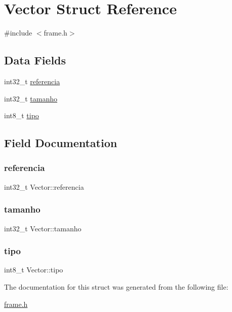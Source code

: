 \hypertarget{structVector}{}\section{Vector Struct Reference}
\label{structVector}


{\ttfamily \#include $<$frame.\+h$>$}

\subsection*{Data Fields}
\begin{DoxyCompactItemize}
\item 
int32\+\_\+t \hyperlink{structVector_a0f2af0912b4d39a569c01fc73c409b0f}{referencia}
\item 
int32\+\_\+t \hyperlink{structVector_a7444f49069adbd72108bda57a0585476}{tamanho}
\item 
int8\+\_\+t \hyperlink{structVector_a7dfc8127c1b5681c6b4ccd3c036710e7}{tipo}
\end{DoxyCompactItemize}


\subsection{Field Documentation}
\mbox{\label{structVector_a0f2af0912b4d39a569c01fc73c409b0f}} 
\subsubsection{\texorpdfstring{referencia}{referencia}}
{\footnotesize\ttfamily int32\+\_\+t Vector\+::referencia}

\mbox{\label{structVector_a7444f49069adbd72108bda57a0585476}} 
\subsubsection{\texorpdfstring{tamanho}{tamanho}}
{\footnotesize\ttfamily int32\+\_\+t Vector\+::tamanho}

\mbox{\label{structVector_a7dfc8127c1b5681c6b4ccd3c036710e7}} 
\subsubsection{\texorpdfstring{tipo}{tipo}}
{\footnotesize\ttfamily int8\+\_\+t Vector\+::tipo}



The documentation for this struct was generated from the following file\+:\begin{DoxyCompactItemize}
\item 
\hyperlink{frame_8h}{frame.\+h}\end{DoxyCompactItemize}
